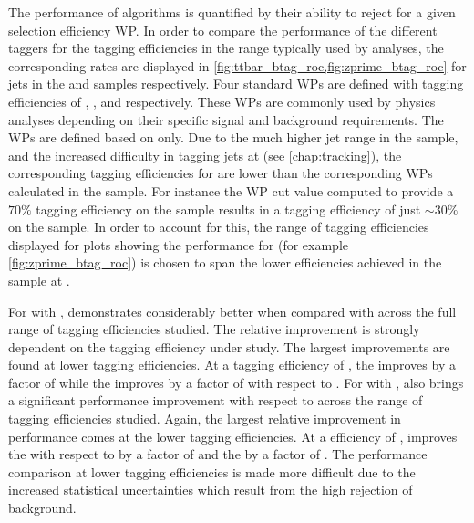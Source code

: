 The performance of \btag algorithms is quantified by their ability to reject \cljets for a given \bjet selection efficiency WP.
In order to compare the \btag performance of the different taggers for the \bjet tagging efficiencies in the range typically used by analyses, the corresponding \clrej rates are displayed in \cref{fig:ttbar_btag_roc,fig:zprime_btag_roc} for jets in the \ttbar and \Zprime samples respectively.
Four standard WPs are defined with \bjet tagging efficiencies of , ,  and  respectively.
These WPs are commonly used by physics analyses depending on their specific signal and background requirements.
The WPs are defined based on \ttbarjets only.
Due to the much higher jet \pt range in the \Zprime sample, and the increased difficulty in tagging jets at \highpt (see \cref{chap:tracking}), the corresponding \bjet tagging efficiencies for \Zprimejets are lower than the corresponding WPs calculated in the \ttbar sample.
For instance the WP cut value computed to provide a $70\%$ \bjet tagging efficiency on the \ttbar sample results in a \bjet tagging efficiency of just $\sim30\%$ on the \Zprime sample.
In order to account for this, the range of \bjet tagging efficiencies displayed for plots showing the performance for \Zprimejets (for example \cref{fig:zprime_btag_roc}) is chosen to span the lower efficiencies achieved in the \Zprime sample at \highpt.

For \ttbarjets with \ttbarpt, \GNN demonstrates considerably better \clrej when compared with \DLr across the full range of \bjet tagging efficiencies studied.
The relative improvement is strongly dependent on the \bjet tagging efficiency under study.
The largest improvements are found at lower \bjet tagging efficiencies.
At a \bjet tagging efficiency of \pct{\ttlo}, the \crej improves by a factor of \ttbclo while the \lrej improves by a factor of \ttbllo with respect to \DLr.
For \highpt \Zprimejets with \Zprimept, \GNN also brings a significant performance improvement with respect to \DLr across the range of \bjet tagging efficiencies studied.
Again, the largest relative improvement in performance comes at the lower \bjet tagging efficiencies.
At a \bjet efficiency of \pct{\zplo}, \GNN improves the \crej with respect to \DLr by a factor of \zpbclo and the \lrej by a factor of \zpbllo.
The performance comparison at lower \bjet tagging efficiencies is made more difficult due to the increased statistical uncertainties which result from the high rejection of background.

